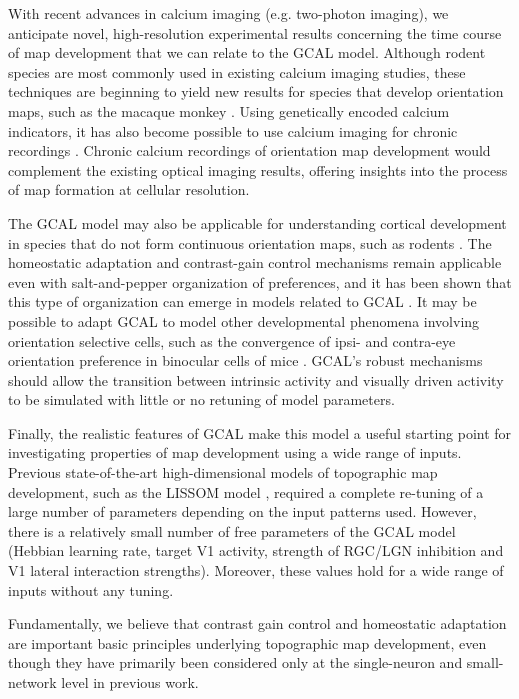 \documentclass{article}
\begin{document}
With recent advances in calcium imaging (e.g. two-photon
  imaging), we anticipate novel, high-resolution experimental
results concerning the time course of map development that we can
relate to the GCAL model. Although rodent species are most commonly
used in existing calcium imaging studies, these
  techniques are beginning to yield new results for species that
develop orientation maps, such as the macaque monkey
\citep{Nauhaus2012}. Using genetically encoded calcium indicators, it
has also become possible to use calcium imaging for chronic
recordings \citep{Lutcke2013}. Chronic
calcium recordings of orientation map development would
complement the existing optical imaging results, offering insights
into the process of map formation at cellular resolution.

The GCAL model may also be applicable for understanding cortical
development in species that do not form continuous
orientation maps, such as rodents \cite{ohki:nature05}. The
homeostatic adaptation and contrast-gain control mechanisms remain
applicable even with salt-and-pepper organization of
preferences, and it has been shown that this type of organization
can emerge in models related to GCAL \citep{law:phd09}. It may be possible to
adapt GCAL to model other developmental phenomena involving
orientation selective cells, such as the convergence of ipsi-
and contra-eye orientation preference in binocular cells of mice
\cite{Wang2010}. GCAL's robust mechanisms should allow the
transition between intrinsic activity and visually driven activity
to be simulated with little or no retuning of model parameters.

Finally, the realistic features of GCAL make this model a useful
starting point for investigating properties of map development using a
wide range of inputs. Previous state-of-the-art high-dimensional
models of topographic map development, such as the LISSOM model
\citep{Miikkulainen2005}, required a complete re-tuning of a large
number of parameters depending on the input patterns used. However,
there is a relatively small number of free parameters of the GCAL model
(Hebbian learning rate, target V1 activity, strength of RGC/LGN
inhibition and V1 lateral interaction strengths). Moreover, these
values hold for a wide range of inputs without any tuning.

Fundamentally, we believe that contrast gain control and
homeostatic adaptation are important basic principles underlying
topographic map development, even though they have primarily been
considered only at the single-neuron and small-network level in previous
work.
\end{document}
